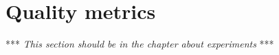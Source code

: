\section{Quality metrics}\label{sec:quality_metrics}
*** \emph{This section should be in the chapter about experiments} ***